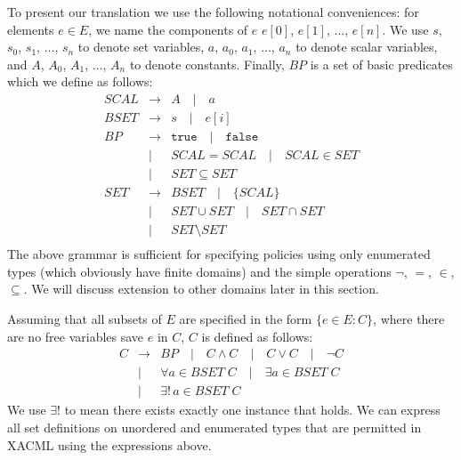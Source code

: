 To present our translation we use the following notational
conveniences: for elements $e \in E$, we name the components of $e$
$e[0]$, $e[1]$, $\dots$, $e[n]$.  We use $s$, $s_0$, $s_1$, $\dots$,
$s_n$ to denote set variables, $a$, $a_0$, $a_1$, $\dots$, $a_n$ to
denote scalar variables, and $A$, $A_0$, $A_1$, $\dots$, $A_n$ to
denote constants.  Finally, $BP$ is a set of basic predicates which we
define as follows:
\begin{eqnarray*}
  SCAL & \rightarrow & A \quad | \quad a \\
  BSET & \rightarrow & s \quad | \quad e[i] \\
  BP & \rightarrow &  \texttt{true} \quad | \quad \texttt{false} \\
 & | & SCAL = SCAL \quad | \quad SCAL \in SET  \\
 & | &  SET \subseteq SET \\
  SET & \rightarrow & BSET  \quad | \quad \{ SCAL \} \\
  & | & SET \cup SET \quad | \quad SET \cap SET  \\
  & | &  SET \setminus SET \\
\end{eqnarray*}
The above grammar is sufficient for specifying policies using only
enumerated types (which obviously have finite domains) and the simple
operations $\neg$, $=$, $\in$, $\subseteq$.  We will discuss extension
to other domains later in this section.

Assuming that all subsets of $E$ are specified in the form $\{ e \in E
: C \}$, where there are no free variables save $e$ in $C$, $C$ is
defined as follows:
\begin{eqnarray*}
  C & \rightarrow & BP \quad | 
      \quad C \wedge C \quad | \quad C \vee C \quad | \quad \neg C \\
 & | &   \forall a \in BSET \; C \quad |
  \quad \exists a \in BSET \; C  \\
  & | & \exists ! \, a \in BSET \; C \quad 
\end{eqnarray*}
We use $\exists !$ to mean there exists exactly one instance that
holds.  We can express all set definitions on unordered and enumerated
types that are permitted in XACML using the expressions above.

